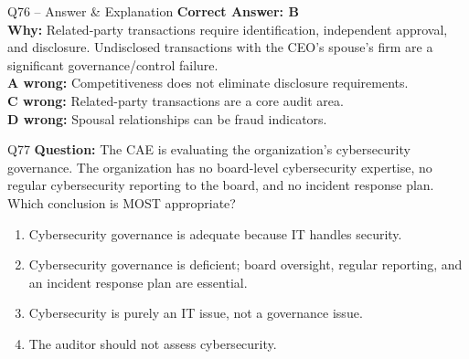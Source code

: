 \documentclass[aspectratio=169,10pt]{beamer}
\begin{document}
	\begin{frame}[t]{Q76 -- Answer \& Explanation}
		\small
		\textbf{Correct Answer: B} \\[4pt]
		\textbf{Why:} Related-party transactions require identification, independent approval, and disclosure. Undisclosed transactions with the CEO's spouse's firm are a significant governance/control failure. \\[4pt]
		\textbf{A wrong:} Competitiveness does not eliminate disclosure requirements. \\[2pt]
		\textbf{C wrong:} Related-party transactions are a core audit area. \\[2pt]
		\textbf{D wrong:} Spousal relationships can be fraud indicators.
	\end{frame}
	
	\begin{frame}[t]{Q77}
		\small
		\textbf{Question:} The CAE is evaluating the organization's cybersecurity governance. The organization has no board-level cybersecurity expertise, no regular cybersecurity reporting to the board, and no incident response plan. Which conclusion is MOST appropriate?
		\begin{enumerate}[label=\Alph*.,itemsep=1pt,topsep=2pt]
			\item Cybersecurity governance is adequate because IT handles security.
			\item Cybersecurity governance is deficient; board oversight, regular reporting, and an incident response plan are essential.
			\item Cybersecurity is purely an IT issue, not a governance issue.
			\item The auditor should not assess cybersecurity.
		\end{enumerate}
	\end{frame}
	
\end{document}
